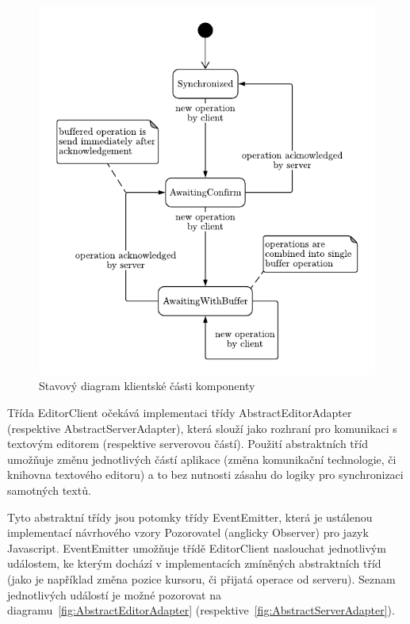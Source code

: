 \begin{figure}[ht!]
    \centering
    \includegraphics[width=\textwidth]{partials/navrh/stavovyDiagram.pdf}
    \caption{Stavový diagram klientské části komponenty}\label{fig:stavovyDiagram}
\end{figure}

Třída EditorClient očekává implementaci třídy AbstractEditorAdapter (respektive AbstractServerAdapter), která slouží jako rozhraní pro komunikaci s textovým editorem (respektive serverovou částí).
Použití abstraktních tříd umožňuje změnu jednotlivých částí aplikace (změna komunikační technologie, či knihovna textového editoru) a to bez nutnosti zásahu do logiky pro synchronizaci samotných textů.

Tyto abstraktní třídy jsou potomky třídy EventEmitter, která je ustálenou implementací návrhového vzory Pozorovatel (anglicky Observer) pro jazyk Javascript.
EventEmitter umožňuje třídě EditorClient naslouchat jednotlivým událostem, ke kterým dochází v implementacích zmíněných abstraktních tříd (jako je například změna pozice kursoru, či přijatá operace od serveru).
Seznam jednotlivých událostí je možné pozorovat na diagramu~\ref{fig:AbstractEditorAdapter} (respektive~\ref{fig:AbstractServerAdapter}).

